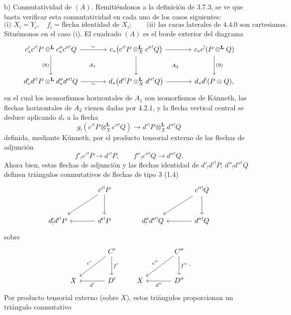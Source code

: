 \begin{prooftext}[Demostración]
b) Conmutatividad de $(A)$. Remitiéndonos a la definición de 3.7.3, se ve que basta verificar esta conmutatividad en cada uno de los casos siguientes:
\[
\text{(i) } X_i=Y_i,\quad f_i=\text{flecha identidad de }X_i;\qquad
\text{(ii) las caras laterales de 4.4.0 son cartesianas.}
\]
Situémonos en el caso (i). El cuadrado $(A)$ es el borde exterior del diagrama
\[
\begin{tikzcd}[column sep=large,row sep=large]
c'_*c'{}^!P\otimes^{\mathbf L}c''_*c''{}^!Q
 \arrow[r,"\sim"] \arrow[d,"(8)"'] &
c_*\bigl(c'{}^!P\otimes_X^{\mathbf L}c''{}^!Q\bigr)
 \arrow[r] \arrow[d] &
c_*c^!(P\otimes^{\mathbf L} Q)\arrow[d,"(9)"]\\
d'_*d'{}^!P\otimes^{\mathbf L}d''_*d''{}^!Q
 \arrow[r,"\sim"'] &
d_*\bigl(d'{}^!P\otimes_X^{\mathbf L}d''{}^!Q\bigr)
 \arrow[r] &
d_*d^!(P\otimes Q),
\arrow[from=1-1,to=2-2, phantom, "\scriptstyle A_1"]
\arrow[from=1-2,to=2-3, phantom, "\scriptstyle A_2"]
\end{tikzcd}
\]
en el cual los isomorfismos horizontales de $A_1$ son isomorfismos de Künneth, las flechas horizontales de $A_2$ vienen dadas por 4.2.1, y la flecha vertical central se deduce aplicando $d_*$ a la flecha
\[
g_!(c'{}^!P\otimes_X^{\mathbf L}c''{}^!Q)\longrightarrow d'{}^!P\otimes_X^{\mathbf L}d''{}^!Q
\]
definida, mediante Künneth, por el producto tensorial externo de las flechas de adjunción
\[
f'_!c'{}^!P\longrightarrow d'{}^!P,\qquad
f''_!c''{}^!Q\longrightarrow d''{}^!Q.
\]
Ahora bien, estas flechas de adjunción y las flechas identidad de $d'_!d'{}^!P$, $d''_!d''{}^!Q$ definen triángulos conmutativos de flechas de tipo $3$ (1.4)
\[
\begin{tikzcd}[column sep=large,row sep=large]
& c'{}^!P \arrow[d] \arrow[dl] & & c''{}^!Q \arrow[d]\arrow[dl]\\
d'_!d'{}^!P & d'{}^!P\arrow[l] & d''_!d''{}^!Q & d''{}^!Q\arrow[l]
\end{tikzcd}
\]
sobre
\[
\begin{tikzcd}[column sep=large,row sep=large]
& C' \arrow[d,"f'"] \arrow[dl,"c'"']\\
X & D'\arrow[l,"d'"]
\end{tikzcd}
\qquad
\begin{tikzcd}[column sep=large,row sep=large]
& C'' \arrow[d,"f''"] \arrow[dl,"c''"']\\
X & D''\arrow[l,"d''"]
\end{tikzcd}.
\]
Por producto tensorial externo (sobre $X$), estos triángulos proporcionan un triángulo conmutativo
\[
\begin{tikzcd}[column sep=huge,row sep=large]

\end{tikzcd}\]
\end{prooftext}

